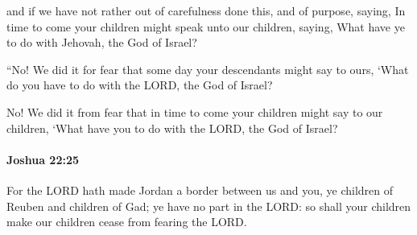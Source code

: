 			\begin{versebox}
					\item[BHS] 
					\item[ASV] and if we have not rather out of carefulness done this, and of purpose, saying, In time to come your children might speak unto our children, saying, What have ye to do with Jehovah, the God of Israel?
					\item[NIV] “No! We did it for fear that some day your descendants might say to ours, ‘What do you have to do with the LORD, the God of Israel?
					\item[NRSV] No! We did it from fear that in time to come your children might say to our children, ‘What have you to do with the LORD, the God of Israel?
			\end{versebox}

		\paragraph{Joshua 22:25} %
			\label{JOSHUA-22-25}

			For the LORD hath made Jordan a border between us and you, ye children of Reuben and children of Gad; ye have no part in the LORD: so shall your children make our children cease from fearing the LORD.

